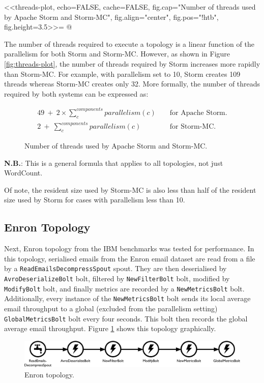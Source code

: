 <<threads-plot, echo=FALSE, cache=FALSE, fig.cap="Number of threads used by Apache Storm and Storm-MC", fig.align="center", fig.pos="!htb", fig.height=3.5>>=
@

The number of threads required to execute a topology is a linear function of the parallelism for both Storm and Storm-MC. However, as shown in Figure \ref{fig:threads-plot}, the number of threads required by Storm increases more rapidly than Storm-MC. For example, with parallelism set to 10, Storm creates 109 threads whereas Storm-MC creates only 32. More formally, the number of threads required by both systems can be expressed as:

\begin{figure}[!htb]
\begin{eqnarray*}
	49 \ + \ 2 \times \sum\limits_{c}^{components} parallelism(c) && \text{ for Apache Storm.} \\
	2 \ + \ \sum\limits_{c}^{components} parallelism(c) && \text{ for Storm-MC.}
\end{eqnarray*}
\caption{Number of threads used by Apache Storm and Storm-MC.}
\end{figure}

\textbf{N.B.}\@\xspace: This is a general formula that applies to all topologies, not just WordCount.

Of note, the resident size used by Storm-MC is also less than half of the resident size used by Storm for cases with parallelism less than 10.

\subsection{Enron Topology}

Next, Enron topology from the IBM benchmarks was tested for performance. In this topology, serialised emails from the Enron email dataset are read from a file by a \texttt{ReadEmailsDecompressSpout} spout. They are then deserialised by \texttt{AvroDeserializeBolt} bolt, filtered by \texttt{NewFilterBolt} bolt, modified by \texttt{ModifyBolt} bolt, and finally metrics are recorded by a \texttt{NewMetricsBolt} bolt. Additionally, every instance of the \texttt{NewMetricsBolt} bolt sends its local average email throughput to a global (excluded from the parallelism setting) \texttt{GlobalMetricsBolt} bolt every four seconds. This bolt then records the global average email throughput. Figure \ref{fig:enron_topology} shows this topology graphically.

\begin{figure}[!htb]
\begin{adjustwidth}{-0.5in}{-0.5in}
	\centering
	\includegraphics[scale=0.475]{pdf/enron_topology.pdf}
	\caption{Enron topology.}
	\label{fig:enron_topology}
\end{adjustwidth}
\end{figure}

